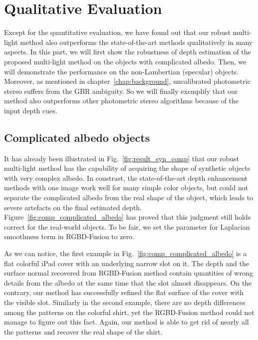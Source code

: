 \section{Qualitative Evaluation}
Except for the quantitative evaluation, we have found out that our robust multi-light method also outperforms the state-of-the-art methods qualitatively in many aspects.
In this part, we will first show the robustness of depth estimation of the proposed multi-light method on the objects with complicated albedo.
Then, we will demonstrate the performance on the non-Lambertian (specular) objects.
Moreover, as mentioned in chapter~\ref{chap:background}, uncalibrated photometric stereo suffers from the GBR ambiguity.
So we will finally exemplify that our method also outperforms other photometric stereo algorithms because of the input depth cues.

\subsection{Complicated albedo objects}
It has already been illustrated in Fig.~\ref{fig:result_syn_comp} that our robust multi-light method has the capability of acquiring the shape of synthetic objects with very complex albedo.
In constrast, the state-of-the-art depth enhancement methods with one image work well for many simple color objects, but could not separate the complicated albedo from the real shape of the object, which leads to severe artefacts on the final estimated depth. 
Figure~\ref{fig:comp_complicated_albedo} has proved that this judgment still holds correct for the real-world objects.
To be fair, we set the parameter for Laplacian smoothness term in RGBD-Fusion to zero.

As we can notice, the first example in Fig.~\ref{fig:comp_complicated_albedo} is a flat colorful iPad cover with an underlying narrow slot on it.
The depth and the surface normal recovered from RGBD-Fusion method contain quantities of wrong details from the albedo at the same time that the slot almost disappears.
On the contrary, our method has successfully refined the flat surface of the cover with the visible slot.
Similarly in the second example, there are no depth differences among the patterns on the colorful shirt, yet the RGBD-Fusion method could not manage to figure out this fact.
Again, our method is able to get rid of nearly all the patterns and recover the real shape of the shirt. 

